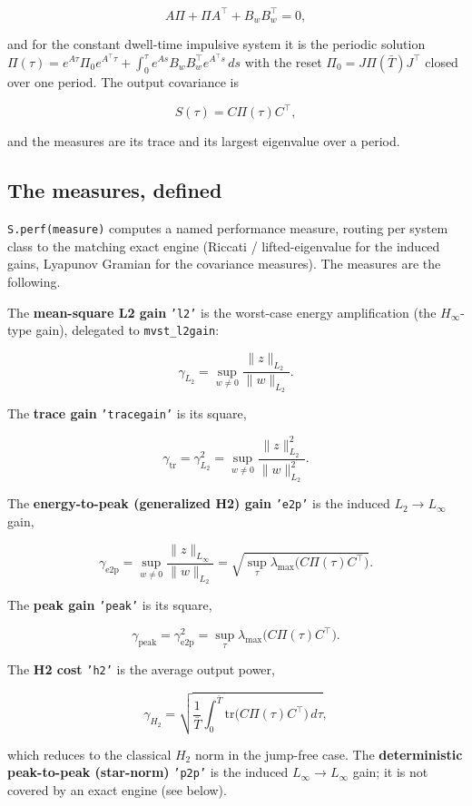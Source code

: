 \documentclass[11pt,oneside]{report}
\newcommand{\code}[1]{\texttt{#1}}
\begin{document}
\[
A\Pi + \Pi A^\top + B_w B_w^\top = 0,
\]

and for the constant dwell-time impulsive system it is the periodic solution
\(\Pi(\tau) = e^{A\tau}\Pi_0 e^{A^\top\tau} + \int_0^\tau e^{As} B_w B_w^\top e^{A^\top s}\,ds\)
with the reset \(\Pi_0 = J\Pi(\bar T)J^\top\) closed over one period. The output
covariance is

\[
S(\tau) = C  \Pi(\tau)  C^\top,
\]

and the measures are its trace and its largest eigenvalue over a period.

\hypertarget{the-measures-defined}{%
\subsection{The measures, defined}\label{the-measures-defined}}

\code{S.perf(measure)} computes a named performance measure, routing per system class
to the matching exact engine (Riccati / lifted-eigenvalue for the induced gains,
Lyapunov Gramian for the covariance measures). The measures are the following.

The \textbf{mean-square L2 gain} \code{'l2'} is the worst-case energy amplification (the
\(H_\infty\)-type gain), delegated to \code{mvst\_l2gain}:

\[
\gamma_{L_2} = \sup_{w \ne 0} \frac{\|z\|_{L_2}}{\|w\|_{L_2}} .
\]

The \textbf{trace gain} \code{'tracegain'} is its square,

\[
\gamma_{\mathrm{tr}} = \gamma_{L_2}^2
= \sup_{w \ne 0} \frac{\|z\|_{L_2}^2}{\|w\|_{L_2}^2} .
\]

The \textbf{energy-to-peak (generalized H2) gain} \code{'e2p'} is the induced
\(L_2 \to L_\infty\) gain,

\[
\gamma_{\mathrm{e2p}} = \sup_{w \ne 0} \frac{\|z\|_{L_\infty}}{\|w\|_{L_2}}
= \sqrt{\sup_\tau \lambda_{\max}\bigl(C \Pi(\tau) C^\top\bigr)} .
\]

The \textbf{peak gain} \code{'peak'} is its square,

\[
\gamma_{\mathrm{peak}} = \gamma_{\mathrm{e2p}}^2
= \sup_\tau \lambda_{\max}\bigl(C \Pi(\tau) C^\top\bigr) .
\]

The \textbf{H2 cost} \code{'h2'} is the average output power,

\[
\gamma_{H_2} = \sqrt{\frac{1}{\bar T}\int_0^{\bar T} \mathrm{tr}\bigl(C \Pi(\tau) C^\top\bigr)\,d\tau},
\]

which reduces to the classical \(H_2\) norm in the jump-free case. The
\textbf{deterministic peak-to-peak (star-norm)} \code{'p2p'} is the induced
\(L_\infty \to L_\infty\) gain; it is not covered by an exact engine (see below).
\end{document}
